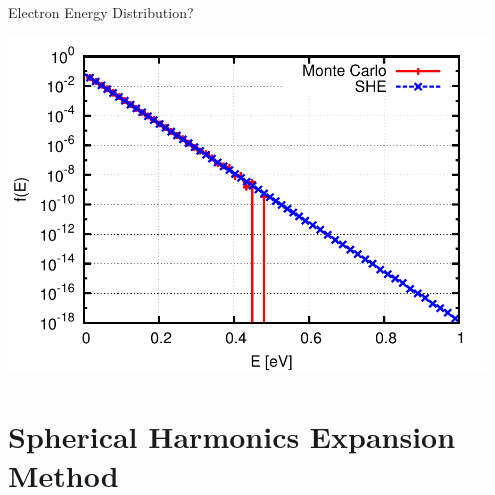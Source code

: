 \documentclass[usepdftitle=false,10pt]{beamer}
\begin{document}

\begin{frame} {Electron Energy Distribution?}
 \begin{center}
  \includegraphics[width=0.95\textwidth]{she-monte-carlo-2}
 \end{center}
\end{frame}
 

\section{Spherical Harmonics Expansion Method}


% 
% 
% 
\end{document}
